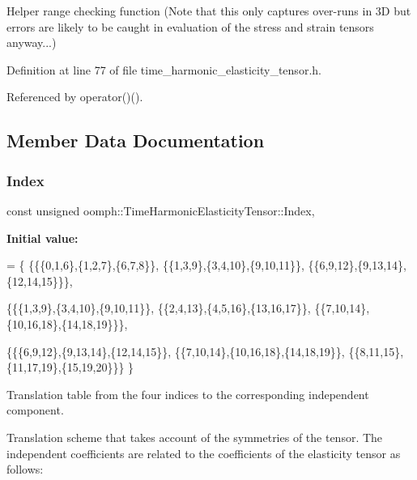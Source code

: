 Helper range checking function (Note that this only captures over-\/runs in 3D but errors are likely to be caught in evaluation of the stress and strain tensors anyway...) 



Definition at line 77 of file time\+\_\+harmonic\+\_\+elasticity\+\_\+tensor.\+h.



Referenced by operator()().



\subsection{Member Data Documentation}
\mbox{\label{classoomph_1_1TimeHarmonicElasticityTensor_a74fa19d788154430e65c6652f05b056f}} 
\subsubsection{\texorpdfstring{Index}{Index}}
{\footnotesize\ttfamily const unsigned oomph\+::\+Time\+Harmonic\+Elasticity\+Tensor\+::\+Index\hspace{0.3cm}{\ttfamily [static]}, {\ttfamily [private]}}

{\bfseries Initial value\+:}
\begin{DoxyCode}
= 
 \{
  \{\{\{0,1,6\},\{1,2,7\},\{6,7,8\}\},
   \{\{1,3,9\},\{3,4,10\},\{9,10,11\}\},
   \{\{6,9,12\},\{9,13,14\},\{12,14,15\}\}\},
   
  \{\{\{1,3,9\},\{3,4,10\},\{9,10,11\}\},
   \{\{2,4,13\},\{4,5,16\},\{13,16,17\}\},
   \{\{7,10,14\},\{10,16,18\},\{14,18,19\}\}\},
  
  \{\{\{6,9,12\},\{9,13,14\},\{12,14,15\}\},
   \{\{7,10,14\},\{10,16,18\},\{14,18,19\}\},
   \{\{8,11,15\},\{11,17,19\},\{15,19,20\}\}\}
 \}
\end{DoxyCode}


Translation table from the four indices to the corresponding independent component. 

Translation scheme that takes account of the symmetries of the tensor. The independent coefficients are related to the coefficients of the elasticity tensor as follows\+:

